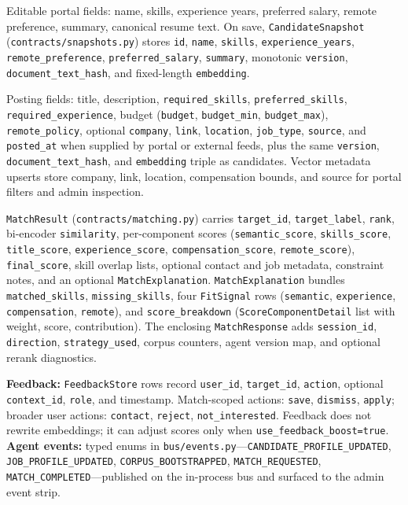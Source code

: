 Editable portal fields: name, skills, experience years, preferred salary, remote preference, summary, canonical resume text.
On save, \texttt{CandidateSnapshot} (\texttt{contracts/snapshots.py}) stores \texttt{id}, \texttt{name}, \texttt{skills}, \texttt{experience\_years}, \texttt{remote\_preference}, \texttt{preferred\_salary}, \texttt{summary}, monotonic \texttt{version}, \texttt{document\_text\_hash}, and fixed-length \texttt{embedding}.

Posting fields: title, description, \texttt{required\_skills}, \texttt{preferred\_skills}, \texttt{required\_experience}, budget (\texttt{budget}, \texttt{budget\_min}, \texttt{budget\_max}), \texttt{remote\_policy}, optional \texttt{company}, \texttt{link}, \texttt{location}, \texttt{job\_type}, \texttt{source}, and \texttt{posted\_at} when supplied by portal or external feeds, plus the same \texttt{version}, \texttt{document\_text\_hash}, and \texttt{embedding} triple as candidates.
Vector metadata upserts store company, link, location, compensation bounds, and source for portal filters and admin inspection.

\texttt{MatchResult} (\texttt{contracts/matching.py}) carries \texttt{target\_id}, \texttt{target\_label}, \texttt{rank}, bi-encoder \texttt{similarity}, per-component scores (\texttt{semantic\_score}, \texttt{skills\_score}, \texttt{title\_score}, \texttt{experience\_score}, \texttt{compensation\_score}, \texttt{remote\_score}), \texttt{final\_score}, skill overlap lists, optional contact and job metadata, constraint notes, and an optional \texttt{MatchExplanation}.
\texttt{MatchExplanation} bundles \texttt{matched\_skills}, \texttt{missing\_skills}, four \texttt{FitSignal} rows (\texttt{semantic}, \texttt{experience}, \texttt{compensation}, \texttt{remote}), and \texttt{score\_breakdown} (\texttt{ScoreComponentDetail} list with weight, score, contribution).
The enclosing \texttt{MatchResponse} adds \texttt{session\_id}, \texttt{direction}, \texttt{strategy\_used}, corpus counters, agent version map, and optional rerank diagnostics.

\textbf{Feedback:} \texttt{FeedbackStore} rows record \texttt{user\_id}, \texttt{target\_id}, \texttt{action}, optional \texttt{context\_id}, \texttt{role}, and timestamp.
Match-scoped actions: \texttt{save}, \texttt{dismiss}, \texttt{apply}; broader user actions: \texttt{contact}, \texttt{reject}, \texttt{not\_interested}.
Feedback does not rewrite embeddings; it can adjust scores only when \texttt{use\_feedback\_boost=true}.
\textbf{Agent events:} typed enums in \texttt{bus/events.py}---\texttt{CANDIDATE\_PROFILE\_UPDATED}, \texttt{JOB\_PROFILE\_UPDATED}, \texttt{CORPUS\_BOOTSTRAPPED}, \texttt{MATCH\_REQUESTED}, \texttt{MATCH\_COMPLETED}---published on the in-process bus and surfaced to the admin event strip.

